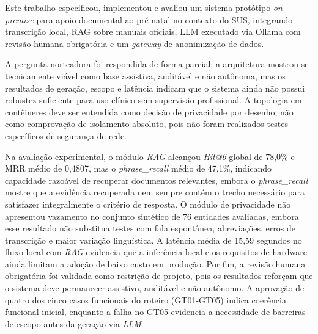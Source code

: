 \documentclass[12pt]{article}
\begin{document}
Este trabalho especificou, implementou e avaliou um sistema protótipo \textit{on-premise} para apoio documental ao pré-natal no contexto do SUS, integrando transcrição local, RAG sobre manuais oficiais, LLM executado via Ollama com revisão humana obrigatória e um \textit{gateway} de anonimização de dados.

A pergunta norteadora foi respondida de forma parcial:
a arquitetura mostrou-se tecnicamente viável como base assistiva, auditável e não autônoma, mas os resultados de geração, escopo e latência indicam que o sistema ainda não possui robustez suficiente para uso clínico sem supervisão profissional.
A topologia em contêineres deve ser entendida como decisão de privacidade por desenho, não como comprovação de isolamento absoluto, pois não foram realizados testes específicos de segurança de rede.

Na avaliação experimental, o módulo \textit{RAG} alcançou \textit{Hit@6} global de 78,0\% e MRR médio de 0,4807, mas o \textit{phrase\_recall} médio de 47,1\%, indicando capacidade razoável de recuperar documentos relevantes, embora o \textit{phrase\_recall} mostre que a evidência recuperada nem sempre contém o trecho necessário para satisfazer integralmente o critério de resposta.
O módulo de privacidade não apresentou vazamento no conjunto sintético de 76 entidades avaliadas, embora esse resultado não substitua testes com fala espontânea, abreviações, erros de transcrição e maior variação linguística.
A latência média de 15,59 segundos no fluxo local com \textit{RAG} evidencia que a inferência local e os requisitos de hardware ainda limitam a adoção de baixo custo em produção.
Por fim, a revisão humana obrigatória foi validada como restrição de projeto, pois os resultados reforçam que o sistema deve permanecer assistivo, auditável e não autônomo.
A aprovação de quatro dos cinco casos funcionais do roteiro (GT01-GT05) indica coerência funcional inicial, enquanto a falha no GT05 evidencia a necessidade de barreiras de escopo antes da geração via \textit{LLM}.

\end{document}
